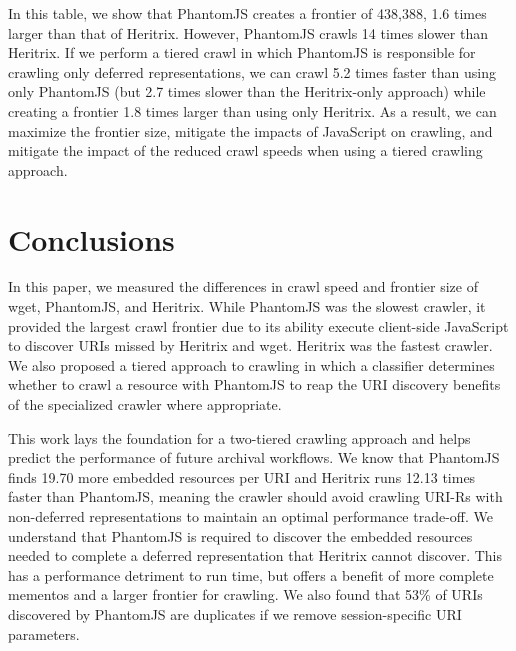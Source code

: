 \documentclass{ipres_proc_article-sp}
\begin{document}

In this table, we show that PhantomJS creates a frontier of 438,388, 1.6 times larger than that of Heritrix. However, PhantomJS crawls 14 times slower than Heritrix. If we perform a tiered crawl in which PhantomJS is responsible for crawling only deferred representations, we can crawl 5.2 times faster than using only PhantomJS (but 2.7 times slower than the Heritrix-only approach) while creating a frontier 1.8 times larger than using only Heritrix. As a result, we can maximize the frontier size, mitigate the impacts of JavaScript on crawling, and mitigate the impact of the reduced crawl speeds when using a tiered crawling approach.

\section{Conclusions}
\label{conclusion}

In this paper, we measured the differences in crawl speed and frontier size of wget, PhantomJS, and Heritrix. While PhantomJS was the slowest crawler, it provided the largest crawl frontier due to its ability execute client-side JavaScript to discover URIs missed by Heritrix and wget. Heritrix was the fastest crawler. We also proposed a tiered approach to crawling in which a classifier determines whether to crawl a resource with PhantomJS to reap the URI discovery benefits of the specialized crawler where appropriate.

This work lays the foundation for a two-tiered crawling approach and helps predict the performance of future archival workflows. We know that PhantomJS finds 19.70 more embedded resources per URI and Heritrix runs 12.13 times faster than PhantomJS, meaning the crawler should avoid crawling URI-Rs with non-deferred representations to maintain an optimal performance trade-off. We understand that PhantomJS is required to discover the embedded resources needed to complete a deferred representation that Heritrix cannot discover. This has a performance detriment to run time, but offers a benefit of more complete mementos and a larger frontier for crawling. We also found that 53\% of URIs discovered by PhantomJS are duplicates if we remove session-specific URI parameters. 
\end{document}
